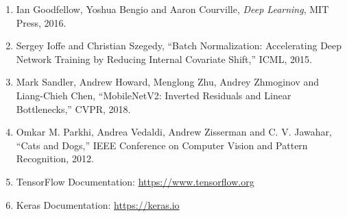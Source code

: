\documentclass[10pt]{article}
\begin{document}
\begin{enumerate}
\item Ian Goodfellow, Yoshua Bengio and Aaron Courville,
\emph{Deep Learning}, MIT Press, 2016.

\item Sergey Ioffe and Christian Szegedy,
``Batch Normalization: Accelerating Deep Network Training by Reducing
Internal Covariate Shift,'' ICML, 2015.

\item Mark Sandler, Andrew Howard, Menglong Zhu, Andrey Zhmoginov and
Liang-Chieh Chen, ``MobileNetV2: Inverted Residuals and Linear
Bottlenecks,'' CVPR, 2018.

\item Omkar M. Parkhi, Andrea Vedaldi, Andrew Zisserman and C. V. Jawahar,
``Cats and Dogs,'' IEEE Conference on Computer Vision and Pattern
Recognition, 2012.

\item TensorFlow Documentation:
\url{https://www.tensorflow.org}

\item Keras Documentation:
\url{https://keras.io}
\end{enumerate}
\end{document}
